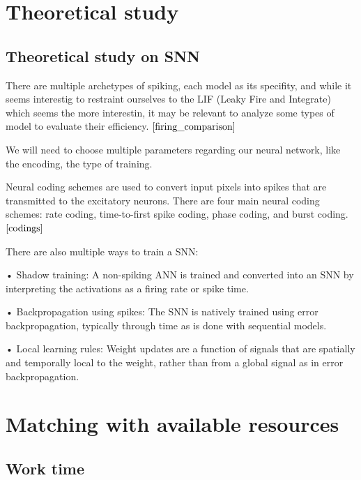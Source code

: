 \documentclass[11pt]{article}
\begin{document}
\section{Theoretical study}
\subsection{Theoretical study on SNN}

There are multiple archetypes of spiking, each model as its specifity, and while it seems interestig to restraint ourselves to the LIF (Leaky Fire and Integrate) which seems the more interestin, it may be relevant to analyze some types of model to evaluate their efficiency. ${\cite{firing_comparison}}$

We will need to choose multiple parameters regarding our neural network, like the encoding, the type of training.

Neural coding schemes are used to convert input pixels into spikes that are transmitted to the excitatory neurons. There are four main neural coding schemes: rate coding, time-to-first spike coding, phase coding, and burst coding.${\cite{codings}}$

There are also multiple ways to train a SNN:

• Shadow training: A non-spiking ANN is trained and converted into an SNN by interpreting the activations as a firing rate or spike time.

• Backpropagation using spikes: The SNN is natively trained using error backpropagation, typically through time as is done with sequential models.

• Local learning rules: Weight updates are a function of signals that are spatially and temporally local to the weight, rather than from a global signal as in error backpropagation.



\section{Matching with available resources}
\subsection{Work time}
\end{document}
